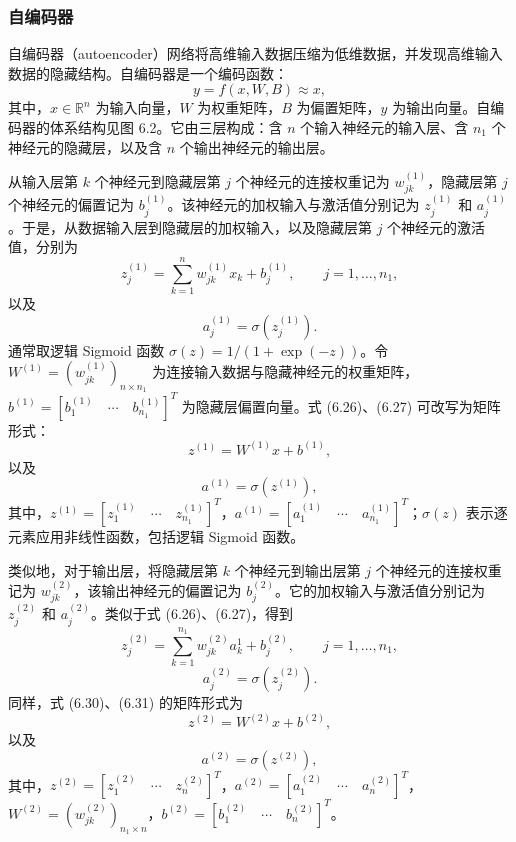 \subsubsection{自编码器}

自编码器（autoencoder）网络将高维输入数据压缩为低维数据，并发现高维输入数据的隐藏结构。自编码器是一个编码函数：
\begin{equation}
y=f(x,W,B)\approx x,
\tag{6.25}
\end{equation}
其中，$x\in\mathbb R^n$ 为输入向量，$W$ 为权重矩阵，$B$ 为偏置矩阵，$y$ 为输出向量。自编码器的体系结构见图 6.2。它由三层构成：含 $n$ 个输入神经元的输入层、含 $n_1$ 个神经元的隐藏层，以及含 $n$ 个输出神经元的输出层。


从输入层第 $k$ 个神经元到隐藏层第 $j$ 个神经元的连接权重记为 $w_{jk}^{(1)}$，隐藏层第 $j$ 个神经元的偏置记为 $b_j^{(1)}$。该神经元的加权输入与激活值分别记为 $z_j^{(1)}$ 和 $a_j^{(1)}$。于是，从数据输入层到隐藏层的加权输入，以及隐藏层第 $j$ 个神经元的激活值，分别为
\begin{equation}
z_j^{(1)}=\sum_{k=1}^nw_{jk}^{(1)}x_k+b_j^{(1)},\qquad j=1,\ldots,n_1,
\tag{6.26}
\end{equation}
以及
\begin{equation}
a_j^{(1)}=\sigma(z_j^{(1)}).
\tag{6.27}
\end{equation}
通常取逻辑 Sigmoid 函数 $\sigma(z)=1/(1+\exp(-z))$。令 $W^{(1)}=(w_{jk}^{(1)})_{n\times n_1}$ 为连接输入数据与隐藏神经元的权重矩阵，$b^{(1)}=[b_1^{(1)}\quad\cdots\quad b_{n_1}^{(1)}]^T$ 为隐藏层偏置向量。式 (6.26)、(6.27) 可改写为矩阵形式：
\begin{equation}
z^{(1)}=W^{(1)}x+b^{(1)},
\tag{6.28}
\end{equation}
以及
\begin{equation}
a^{(1)}=\sigma(z^{(1)}),
\tag{6.29}
\end{equation}
其中，$z^{(1)}=[z_1^{(1)}\quad\cdots\quad z_{n_1}^{(1)}]^T$，$a^{(1)}=[a_1^{(1)}\quad\cdots\quad a_{n_1}^{(1)}]^T$；$\sigma(z)$ 表示逐元素应用非线性函数，包括逻辑 Sigmoid 函数。

类似地，对于输出层，将隐藏层第 $k$ 个神经元到输出层第 $j$ 个神经元的连接权重记为 $w_{jk}^{(2)}$，该输出神经元的偏置记为 $b_j^{(2)}$。它的加权输入与激活值分别记为 $z_j^{(2)}$ 和 $a_j^{(2)}$。类似于式 (6.26)、(6.27)，得到
\begin{equation}
z_j^{(2)}=\sum_{k=1}^{n_1}w_{jk}^{(2)}a_k^1+b_j^{(2)},\qquad j=1,\ldots,n_1,
\tag{6.30}
\end{equation}
\begin{equation}
a_j^{(2)}=\sigma(z_j^{(2)}).
\tag{6.31}
\end{equation}
同样，式 (6.30)、(6.31) 的矩阵形式为
\begin{equation}
z^{(2)}=W^{(2)}x+b^{(2)},
\tag{6.32}
\end{equation}
以及
\begin{equation}
a^{(2)}=\sigma(z^{(2)}),
\tag{6.33}
\end{equation}
其中，$z^{(2)}=[z_1^{(2)}\quad\cdots\quad z_n^{(2)}]^T$，$a^{(2)}=[a_1^{(2)}\quad\cdots\quad a_n^{(2)}]^T$，$W^{(2)}=(w_{jk}^{(2)})_{n_1\times n}$，$b^{(2)}=[b_1^{(2)}\quad\cdots\quad b_n^{(2)}]^T$。

